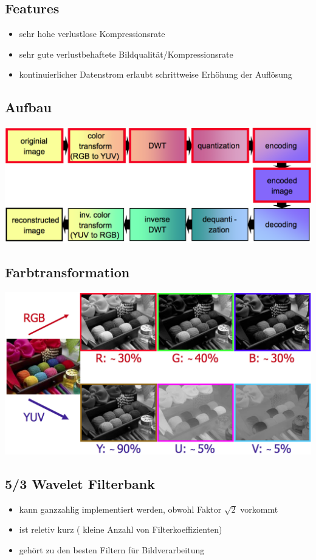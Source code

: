 \documentclass[10pt]{article}
\begin{document}
\subsection{Features}
\begin{itemize}
	\item sehr hohe verlustlose Kompressionsrate
	\item sehr gute verlustbehaftete Bildqualität/Kompressionsrate
	\item kontinuierlicher Datenstrom erlaubt schrittweise Erhöhung der Auflösung
\end{itemize}
\subsection{Aufbau}
\begin{center}
	\includegraphics[scale=0.3]{pgf-aufbau.png}
\end{center}
\subsection{Farbtransformation}
\begin{center}
	\includegraphics[scale=0.3]{pgf-farbtransformation.png}
\end{center}
\subsection{5/3 Wavelet Filterbank}
\begin{itemize}
	\item kann ganzzahlig implementiert werden, obwohl Faktor $\sqrt{2}$ vorkommt
	\item ist reletiv kurz ( kleine Anzahl von Filterkoeffizienten)
	\item gehört zu den besten Filtern für Bildverarbeitung
\end{itemize}
\end{document}
